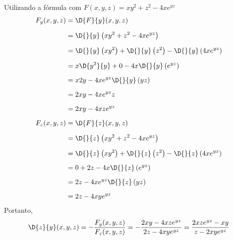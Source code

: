 \documentclass[a4paper,12pt,fleqn]{article}
\begin{document}
\begin{answer}
  Utilizando a fórmula com \(F(x, y, z) = xy^2 + z^2 - 4xe^{yz}\)
  \begin{align*}
    F_y(x, y, z)
    & = \D{F}{y}(x, y, z) \\[2mm]
    & = \D{}{y} \left(xy^2 + z^2 - 4xe^{yz}\right) \\[2mm]
    & = \D{}{y} \left(xy^2\right)
      + \D{}{y} \left(z^2 \right)
      - \D{}{y} \left(4xe^{yz}\right) \\[2mm]
    & = x \D{y^2}{y} + 0 - 4x\D{}{y}\left(e^{yz}\right) \\[2mm]
    & = x2y - 4xe^{yz}\D{}{y}\left(yz\right) \\[2mm]
    & = 2xy - 4xe^{yz}z \\[2mm]
    & = 2xy - 4xze^{yz} \\[2mm]
    F_z(x, y, z)
    & = \D{F}{z}(x, y, z) \\[2mm]
    & = \D{}{z} \left(xy^2 + z^2 - 4xe^{yz}\right) \\[2mm]
    & = \D{}{z} \left(xy^2\right)
      + \D{}{z} \left(z^2 \right)
      - \D{}{z} \left(4xe^{yz}\right) \\[2mm]
    & = 0 + 2z - 4x\D{}{z}\left(e^{yz}\right) \\[2mm]
    & = 2z - 4xe^{yz}\D{}{z}\left(yz\right) \\[2mm]
    & = 2z - 4xye^{yz}
  \end{align*}
  Portanto,
  \[
    \D{z}{y}(x, y, z)
    = -\frac{F_y(x, y, z)}{F_z(x, y, z)}
    = -\frac{2xy - 4xze^{yz}}{2z - 4xye^{yz}}
    = \frac{2xze^{yz}- xy}{z - 2xye^{yz}}
  \]
\end{answer}

\end{document}
